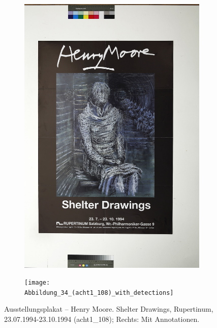 \documentclass[a4paper,12pt,ngerman]{article}
\begin{document}
\newpage
\begin{landscape}
\begin{figure}[ht]
	\begin{subfigure}[b]{0.5\linewidth}
	\centering
	\includegraphics[height=\linewidth]{Abbildung_38_(acht1_108)}
	\end{subfigure}
	\begin{subfigure}[b]{0.5\linewidth}
	\centering
	\texttt{[image: Abbildung\_34\_(acht1\_108)\_with\_detections]}
	\end{subfigure}
	\caption{Ausstellungsplakat – Henry Moore. Shelter Drawings, Rupertinum, 23.07.1994-23.10.1994 (acht1\_108); Rechts: Mit Annotationen.}
\end{figure}
\end{landscape}
\end{document}
